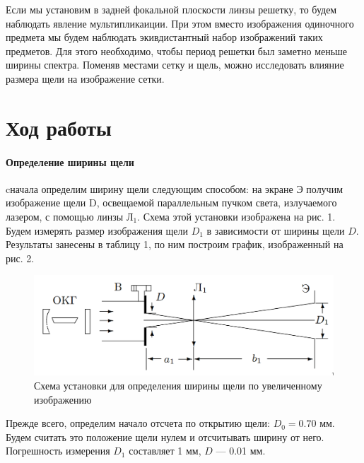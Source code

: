\documentclass[a4paper,12pt]{article}
\begin{document}
\noindent
Если мы установим в задней фокальной плоскости линзы решетку, то будем наблюдать явление мультипликаиции. При этом вместо изображения одиночного предмета мы будем наблюдать экивдистантный набор изображений таких предметов. Для этого необходимо, чтобы период решетки был заметно меньше ширины спектра. Поменяв местами сетку и щель, можно исследовать влияние размера щели на изображение сетки.


\section*{Ход работы}
\paragraph{Определение ширины щели} cначала определим ширину щели следующим способом: на экране Э получим изображение щели D, освещаемой параллельным пучком света, излучаемого лазером, с помощью линзы Л$_1$. Схема этой установки изображена на рис. 1. Будем измерять размер изображения щели $D_1$ в зависимости от ширины щели $D$. Результаты занесены в таблицу 1, по ним построим график, изображенный на рис. 2.

\begin{figure}[H]
    \centering
    \includegraphics[scale=0.3]{image_1_.png}
    \caption{Схема установки для определения ширины щели по увеличенному изображению}
\end{figure}

\noindent
Прежде всего, определим начало отсчета по открытию щели: $D_0 = 0.70$ мм. Будем считать это положение щели нулем и отсчитывать ширину от него. Погрешность измерения $D_1$ составляет 1 мм, $D$ --- 0.01 мм.
\end{document}
